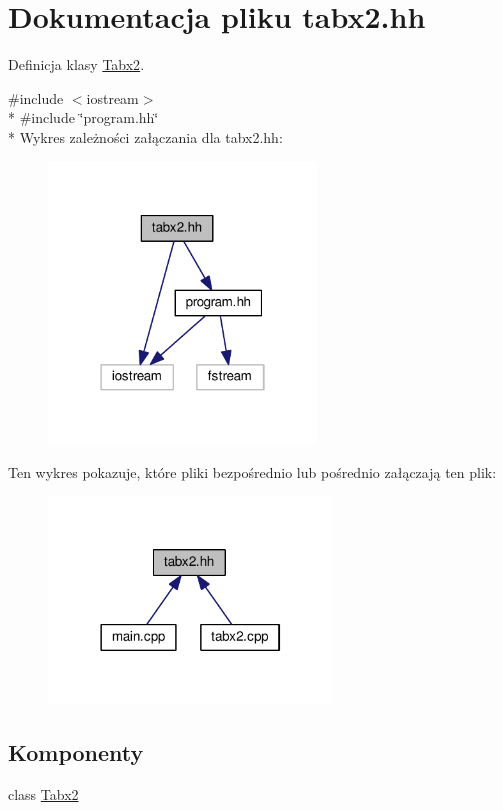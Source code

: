 \hypertarget{tabx2_8hh}{\section{Dokumentacja pliku tabx2.\-hh}
\label{tabx2_8hh}
}


Definicja klasy \hyperlink{class_tabx2}{Tabx2}.  


{\ttfamily \#include $<$iostream$>$}\\*
{\ttfamily \#include \char`\"{}program.\-hh\char`\"{}}\\*
Wykres zależności załączania dla tabx2.\-hh\-:\nopagebreak
\begin{figure}[H]
\begin{center}
\leavevmode
\includegraphics[width=202pt]{tabx2_8hh__incl}
\end{center}
\end{figure}
Ten wykres pokazuje, które pliki bezpośrednio lub pośrednio załączają ten plik\-:\nopagebreak
\begin{figure}[H]
\begin{center}
\leavevmode
\includegraphics[width=213pt]{tabx2_8hh__dep__incl}
\end{center}
\end{figure}
\subsection*{Komponenty}
\begin{DoxyCompactItemize}
\item 
class \hyperlink{class_tabx2}{Tabx2}
\end{DoxyCompactItemize}


